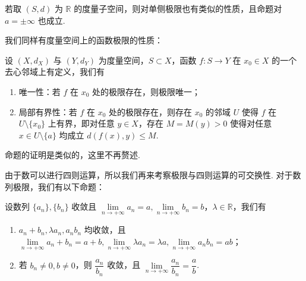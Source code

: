 \documentclass[../main.tex]{subfiles}
\begin{document}
\begin{remark}
    若取 $(S, d)$ 为 $\mathbb R$ 的度量子空间，则对单侧极限也有类似的性质，且命题对 $a = \pm \infty$ 也成立. 
\end{remark}

我们同样有度量空间上的函数极限的性质：

\begin{proposition}[度量空间上函数极限的基本性质] \label{prop:lim-func-ms}
    设 $(X, d_X)$ 与 $(Y, d_Y)$ 为度量空间，$S \subset X$，函数 $f:S \to Y$ 在 $x_0 \in X$ 的一个去心邻域上有定义，我们有
    \begin{enumerate}[label=(\alph*)]
        \item 唯一性：若 $f$ 在 $x_0$ 处的极限存在，则极限唯一；
        \item 局部有界性：若 $f$ 在 $x_0$ 处的极限存在，则存在 $x_0$ 的邻域 $U$ 使得 $f$ 在 $U \setminus \{x_0\}$ 上有界，即对任意 $y \in X$，存在 $M = M(y) > 0$ 使得对任意 $x \in U \setminus \{a\}$ 均成立 $d(f(x), y) \leqslant M$. 
    \end{enumerate}
\end{proposition}

命题的证明是类似的，这里不再赘述. 

由于数可以进行四则运算，所以我们再来考察极限与四则运算的可交换性. 对于数列极限，我们有以下命题：

\begin{proposition}[数列极限与四则运算的可交换性] \label{prop:lim-num-seq-swap-op}
    设数列 $\{a_n\}, \{b_n\}$ 收敛且 $\lim\limits_{n \to +\infty} a_n = a, \lim\limits_{n \to +\infty} b_n = b$，$\lambda \in \mathbb R$，我们有
    \begin{enumerate}[label=(\alph*)]
        \item $a_n + b_n, \lambda a_n, a_n b_n$ 均收敛，且 $\lim\limits_{n \to +\infty} a_n + b_n = a + b, \lim\limits_{n \to +\infty} \lambda a_n = \lambda a, \lim\limits_{n \to +\infty} a_n b_n = ab$；

        \item 若 $b_n \neq 0, b \neq 0$，则 $\dfrac{a_n}{b_n}$ 收敛，且 $\lim\limits_{n \to +\infty} \dfrac{a_n}{b_n} = \dfrac{a}{b}$. 
    \end{enumerate}
\end{proposition}
\end{document}
